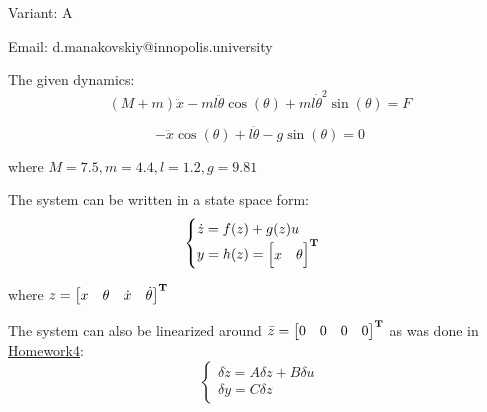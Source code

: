 \documentclass[12pt,letterpaper]{article}
\begin{document}
Variant: A

Email: d.manakovskiy@innopolis.university

The given dynamics:
\begin{equation}
    \label{given:1}
    (M + m)\ddot x - ml \ddot \theta \cos(\theta) + ml \dot\theta^2 \sin(\theta) = F
\end{equation}

\begin{equation}
    \label{given:2}
    - \ddot x \cos(\theta) + l \ddot\theta - g\sin(\theta) = 0
\end{equation}

where $M = 7.5, m = 4.4, l = 1.2, g = 9.81$

The system can be written in a state space form:
\begin{equation*}
    \begin{cases}
    \dot z = f(z) +g(z)u \\
    y = h(z) = 
        \begin{bmatrix}
            x & \theta 
        \end{bmatrix}  ^\mathbf{T}
    \end{cases}
\end{equation*} 

where $z = 
    \begin{bmatrix}
        x & \theta & \dot x & \dot \theta 
    \end{bmatrix}  ^\mathbf{T}$
    
The system can also be linearized around $\bar z = \begin{bmatrix}
            0 & 0 
            & 0 
            & 0
        \end{bmatrix} ^\mathbf{T}$
as was done in \href{https://github.com/WinnerOK/LinearControl_assignments/tree/assignment_dev/HomeWork4}{Homework4}:
\begin{equation*}
    \begin{cases}
        \delta \dot z = A \delta z + B \delta u \\
        \delta y = C \delta z
    \end{cases}
\end{equation*}
\end{document}
